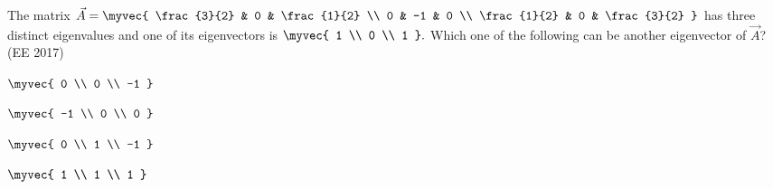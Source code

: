 \item The matrix 
	$
\vec{A} = \myvec{
\frac{3}{2} & 0 & \frac{1}{2} \\
0 & -1 & 0 \\
\frac{1}{2} & 0 & \frac{3}{2}
}
$
has three distinct eigenvalues and one of its eigenvectors is 
$
\myvec{ 1 \\ 0 \\ 1 }.
$
Which one of the following can be another eigenvector of $\vec{A}$?
\hfill(EE 2017)
\begin{enumerate}
\begin{multicols}{4}
\item $\myvec{ 0 \\ 0 \\ -1 }$
\item $\myvec{ -1 \\ 0 \\ 0 }$
\item $\myvec{ 0 \\ 1 \\ -1 }$
\item $\myvec{ 1 \\ 1 \\ 1 }$
\end{multicols}
\end{enumerate}

